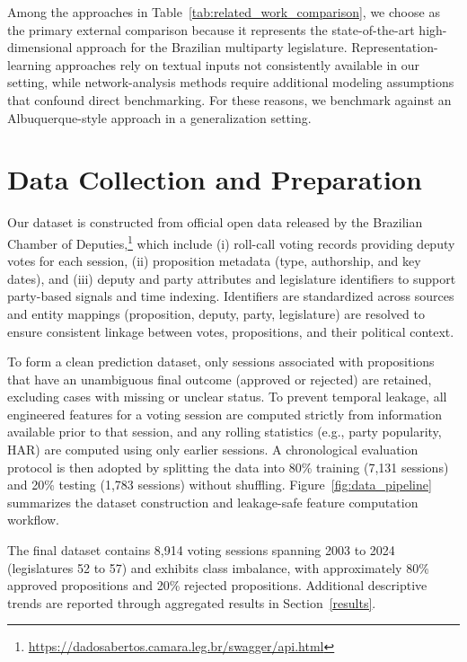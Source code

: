 \documentclass[review]{elsarticle}
\begin{document}
Among the approaches in Table~\ref{tab:related_work_comparison}, we choose \citet{Albuquerque2025Forecasting} as the primary external comparison because it represents the state-of-the-art high-dimensional approach for the Brazilian multiparty legislature. Representation-learning approaches rely on textual inputs not consistently available in our setting, while network-analysis methods require additional modeling assumptions that confound direct benchmarking. For these reasons, we benchmark against an Albuquerque-style approach in a generalization setting.



\section{Data Collection and Preparation}
\label{data}

Our dataset is constructed from official open data released by the Brazilian Chamber of Deputies,\footnote{\url{https://dadosabertos.camara.leg.br/swagger/api.html}} which include (i) roll-call voting records providing deputy votes for each session, (ii) proposition metadata (type, authorship, and key dates), and (iii) deputy and party attributes and legislature identifiers to support party-based signals and time indexing. Identifiers are standardized across sources and entity mappings (proposition, deputy, party, legislature) are resolved to ensure consistent linkage between votes, propositions, and their political context.

To form a clean prediction dataset, only sessions associated with propositions that have an unambiguous final outcome (approved or rejected) are retained, excluding cases with missing or unclear status. To prevent temporal leakage, all engineered features for a voting session are computed strictly from information available prior to that session, and any rolling statistics (e.g., party popularity, HAR) are computed using only earlier sessions. A chronological evaluation protocol is then adopted by splitting the data into 80\% training (7,131 sessions) and 20\% testing (1,783 sessions) without shuffling. Figure~\ref{fig:data_pipeline} summarizes the dataset construction and leakage-safe feature computation workflow.

The final dataset contains 8,914 voting sessions spanning 2003 to 2024 (legislatures 52 to 57) and exhibits class imbalance, with approximately 80\% approved propositions and 20\% rejected propositions. Additional descriptive trends are reported through aggregated results in Section~\ref{results}.
\end{document}
